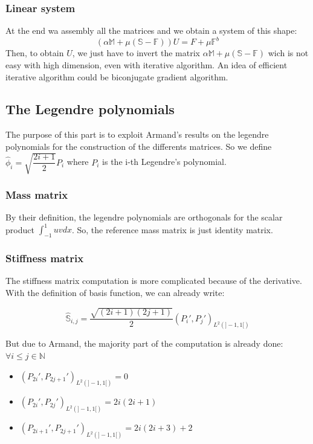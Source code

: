 \documentclass[a4paper,10pt]{article}
\begin{document}
\fi

\subsubsection{Linear system}
At the end wa assembly all the matrices and we obtain a system of this shape:
\begin{equation}
\left(\alpha \mathbb{M} + \mu (\mathbb{S}-\mathbb{F})\right) U = F + \mu \mathbb{F}^b
\end{equation}
Then, to obtain $U$, we just have to invert the matrix $\alpha \mathbb{M} + \mu 
(\mathbb{S}-\mathbb{F})$ wich is not easy with high dimension, even with iterative algorithm. An 
idea of efficient iterative algorithm could be biconjugate gradient algorithm.

\subsection{The Legendre polynomials}

The purpose of this part is to exploit Armand's results on the legendre polynomials for the 
construction of the differents matrices. So we define $\hat \phi_i = \sqrt{\dfrac{2i+1}{2}} P_i$ 
where $P_i$ is the i-th Legendre's polynomial.

\subsubsection{Mass matrix}
By their definition, the legendre polynomials are orthogonals for the scalar product 
$\int_{-1}^1 uv dx$. So, the reference mass matrix is just identity matrix.

\subsubsection{Stiffness matrix}
The stiffness matrix computation is more complicated because of the derivative. With the 
definition of basis function, we can already write:

\begin{equation*}
 \widehat{\mathbb{S}}_{i,j} = \frac{\sqrt{(2i+1)(2j+1)}}{2} \left( P_i' , P_j' \right)_{L^2(]-1,1[)}
\end{equation*}

But due to Armand, the majority part of the computation is already done: $\forall i\leq j \in 
\mathbb{N}$
\begin{itemize}
 \item $\left(P_{2i}',P_{2j+1}'\right)_{L^2(]-1,1[)} = 0$
 \item $\left(P_{2i}',P_{2j}'\right)_{L^2(]-1,1[)} = 2i(2i+1)$
 \item $\left(P_{2i+1}',P_{2j+1}'\right)_{L^2(]-1,1[)} = 2i(2i+3)+2$
\end{itemize}
\end{document}
